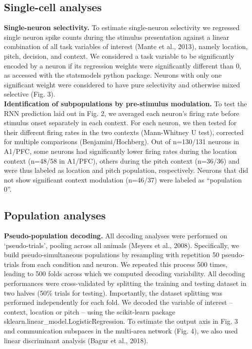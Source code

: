\documentclass[12pt]{article}
\begin{document}
\subsection*{Single-cell analyses}


\textbf{Single-neuron selectivity.} To estimate single-neuron selectivity we regressed single neuron spike counts  during the stimulus presentation against a linear combination of all task variables of interest (Mante et al., 2013), namely location, pitch, decision, and context. We considered a task variable to be significantly encoded by a neuron if its regression weights were significantly different than 0, as accessed with the statsmodels python package. Neurons with only one significant weight were considered to have pure selectivity and otherwise mixed selective (Fig. 3). \\

\textbf{Identification of subpopulations by pre-stimulus modulation.} To test the RNN prediction laid out in Fig. 2, we averaged each neuron’s firing rate before stimulus onset separately in each context. For each neuron, we then tested for their different firing rates in the two contexts (Mann-Whitney U test), corrected for multiple comparisons (Benjamini/Hochberg). Out of n=130/131 neurons in A1/PFC, some neurons had significantly lower firing rates during the location context (n=48/58 in A1/PFC), others during the pitch context (n=36/36) and were thus labeled as location and pitch population, respectively. Neurons that did not show significant context modulation (n=46/37) were labeled as “population 0”.\\

\subsection*{Population analyses}

\textbf{Pseudo-population decoding.} All decoding analyses were performed on ‘pseudo-trials’, pooling across all animals (Meyers et al., 2008). Specifically, we build pseudo-simultaneous populations by resampling with repetition 50 pseudo-trials from each condition and neuron. We repeated this process 500 times, leading to 500 folds across which we computed decoding variability. All decoding performances were cross-validated by splitting the training and testing dataset in two halves (50\% trials for testing). Importantly, the dataset splitting was performed independently for each fold. We decoded the variable of interest – context, location or pitch – using the scikit-learn package sklearn.linear\_model.LogisticRegression. To estimate the output axis in Fig. 3 and communication subspaces in the multi-area network (Fig. 4), we also used linear discriminant analysis (Bagur et al., 2018). \\
\end{document}
